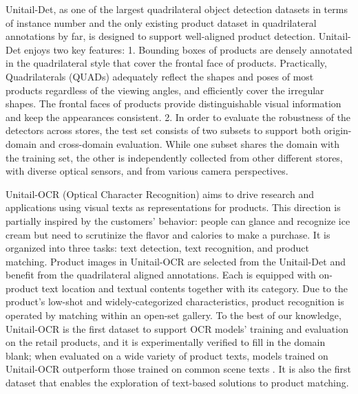 \documentclass[runningheads]{llncs}
\begin{document}
Unitail-Det, as one of the largest quadrilateral object detection datasets in terms of instance number and the only existing product dataset in quadrilateral annotations by far, is designed to support well-aligned product detection. Unitail-Det enjoys two key features: 1. Bounding boxes of products are densely annotated in the quadrilateral style that cover the frontal face of products. Practically, Quadrilaterals (QUADs) adequately reflect the shapes and poses of most products regardless of the viewing angles, and efficiently cover the irregular shapes. The frontal faces of products provide distinguishable visual information and keep the appearances consistent. 
2. In order to evaluate the robustness of the detectors across stores, the test set consists of two subsets to support both origin-domain and cross-domain evaluation. While one subset shares the domain with the training set, the other is independently collected from other different stores, with diverse optical sensors, and from various camera perspectives. %

Unitail-OCR (Optical Character Recognition) aims to drive research and applications using visual texts as representations for products. This direction is partially inspired by the customers' behavior: people can glance and recognize ice cream but need to scrutinize the flavor and calories to make a purchase. It is organized into three tasks: text detection, text recognition, and product matching. Product images in Unitail-OCR are selected from the Unitail-Det and benefit from the quadrilateral aligned annotations. Each is equipped with on-product text location and textual contents together with its category. Due to the product's low-shot and widely-categorized characteristics, product recognition is operated by matching within an open-set gallery. To the best of our knowledge, Unitail-OCR is the first dataset to support OCR models' training and evaluation on the retail products, and it is experimentally verified to fill in the domain blank; when evaluated on a wide variety of product texts, models trained on Unitail-OCR outperform those trained on common scene texts \cite{ICDAR15}. It is also the first dataset that enables the exploration of text-based solutions to product matching.

\end{document}
